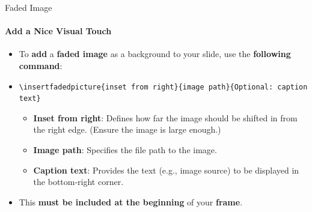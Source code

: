 \documentclass[aspectratio=169]{beamer}
\begin{document}
\begin{frame}{Faded Image}
    \framesubtitle{Add a Nice Visual Touch}


    \vspace{-0.8cm}
    \begin{minipage}[t]{0.75\textwidth}
        \begin{coloredblock}
            \begin{itemize}
               \item To \textbf{add} a \textbf{faded image} as a background to your slide, use the \textbf{following command}:
                \item[] \begin{center}\footnotesize\texttt{\textbackslash insertfadedpicture\{inset from right\}\{image path\}\{Optional: caption text\}}\end{center}
                \begin{itemize}
                    \item \textbf{Inset from right}: Defines how far the image should be shifted in from the right edge. (Ensure the image is large enough.)
                    \item \textbf{Image path}: Specifies the file path to the image.
                    \item \textbf{Caption text}: Provides the text (e.g., image source) to be displayed in the bottom-right corner.
                \end{itemize}
                \item This \textbf{must be included at the beginning} of your \textbf{frame}.
            \end{itemize}     
        \end{coloredblock}
    \end{minipage}
\end{frame}
\end{document}
